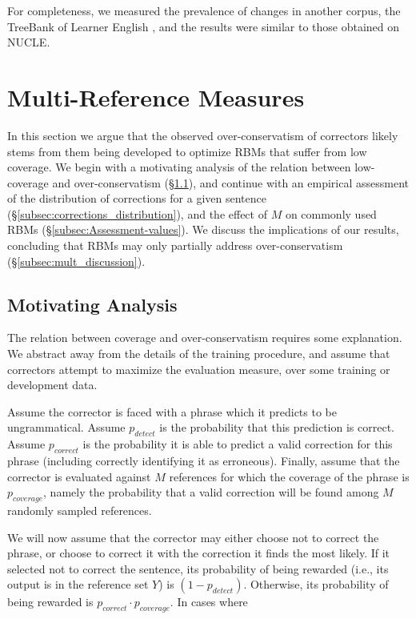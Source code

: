 \documentclass[letter,11pt]{article}
\begin{document}
For completeness, we measured the prevalence of changes in
another corpus, the TreeBank of Learner English \cite{yannakoudakis2011new},
and the results were similar to those obtained on NUCLE.
%
%
\vspace{-.1cm}
\section{Multi-Reference Measures}\label{sec:increase-reference}
%
In this section we argue that the observed over-conservatism of correctors likely stems
from them being developed to optimize RBMs that suffer from low coverage.
We begin with a motivating analysis of the relation between low-coverage and over-conservatism (\S \ref{subsec:motivating_analysis}),
and continue with an empirical assessment of the distribution of corrections for a given sentence (\S \ref{subsec:corrections_distribution}),
and the effect of $M$ on commonly used RBMs (\S \ref{subsec:Assessment-values}).
We discuss the implications of our results, concluding that RBMs may only partially address over-conservatism (\S \ref{subsec:mult_discussion}).
%
\vspace{-.2cm}
\subsection{Motivating Analysis}\label{subsec:motivating_analysis}
%
The relation between coverage and over-conservatism requires some explanation.
We abstract away from the details of the training procedure, and assume that correctors attempt to maximize the evaluation measure, over some training or development data.

Assume the corrector is faced with a phrase which it predicts to be ungrammatical. Assume $p_{detect}$ is the probability that this prediction is correct.
Assume $p_{correct}$ is the probability it is able to predict
a valid correction for this phrase (including correctly identifying it as erroneous).
Finally, assume that the corrector is evaluated
against $M$ references for which the coverage of the phrase is $p_{coverage}$,
namely the probability that
a valid correction will be found among $M$ randomly sampled references.

We will now assume that the corrector may either choose not to correct the phrase,
or choose to correct it with the correction it finds the most likely. If it selected not to correct the sentence, its probability of being rewarded (i.e., its output is in the reference set $Y$) is $(1-p_{detect})$. Otherwise, its probability
of being rewarded is $p_{correct} \cdot p_{coverage}$.
In cases where
\end{document}
